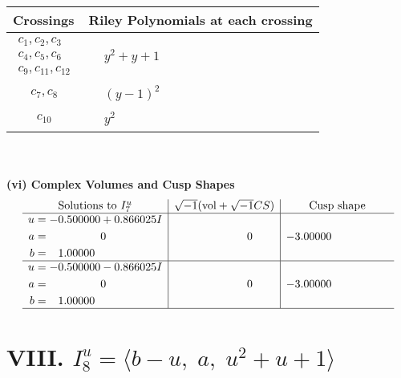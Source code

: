 \documentclass[1p]{elsarticle_modified}
\theoremstyle{definition}
\newcommand{\I}{\sqrt{-1}}
\begin{document}
\begin{tabular}{m{50pt}|m{274pt}}
Crossings & \hspace{64pt}Riley Polynomials at each crossing \\
\hline $$\begin{aligned}c_{1},c_{2},c_{3}\\c_{4},c_{5},c_{6}\\c_{9},c_{11},c_{12}\end{aligned}$$&$\begin{aligned}
&y^2+y+1
\end{aligned}$\\
\hline $$\begin{aligned}c_{7},c_{8}\end{aligned}$$&$\begin{aligned}
&(y-1)^2
\end{aligned}$\\
\hline $$\begin{aligned}c_{10}\end{aligned}$$&$\begin{aligned}
&y^2
\end{aligned}$\\
\hline
\end{tabular}\\~\\
\newpage\flushleft \textbf{(vi) Complex Volumes and Cusp Shapes}
$$\begin{array}{c|c|c}  
\text{Solutions to }I^u_{7}& \I (\text{vol} + \sqrt{-1}CS) & \text{Cusp shape}\\
 \hline 
\begin{aligned}
u &= -0.500000 + 0.866025 I \\
a &= \phantom{-0.000000 } 0 \\
b &= \phantom{-}1.00000\phantom{ +0.000000I}\end{aligned}
 & \phantom{-0.000000 } 0 & -3.00000\phantom{ +0.000000I} \\ \hline\begin{aligned}
u &= -0.500000 - 0.866025 I \\
a &= \phantom{-0.000000 } 0 \\
b &= \phantom{-}1.00000\phantom{ +0.000000I}\end{aligned}
 & \phantom{-0.000000 } 0 & -3.00000\phantom{ +0.000000I}\\
 \hline 
 \end{array}$$\newpage\newpage\renewcommand{\arraystretch}{1}
\centering \section*{VIII. $I^u_{8}= \langle b- u,\;a,\;u^2+u+1 \rangle$}
\end{document}
